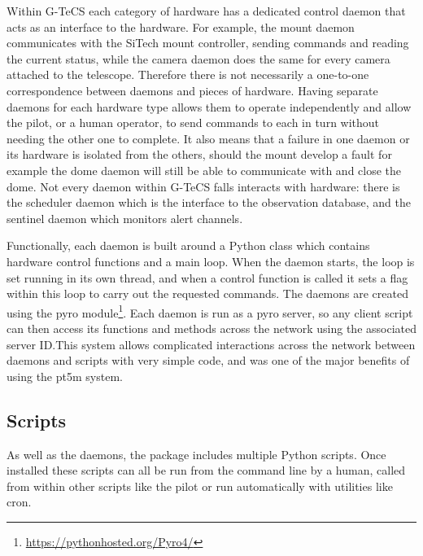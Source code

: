 \begin{colsection}
\begin{colsection}
Within G-TeCS each category of hardware has a dedicated control daemon that acts as an interface to the hardware. For example, the mount daemon communicates with the SiTech mount controller, sending commands and reading the current status, while the camera daemon does the same for every camera attached to the telescope. Therefore there is not necessarily a one-to-one correspondence between daemons and pieces of hardware. Having separate daemons for each hardware type allows them to operate independently and allow the pilot, or a human operator, to send commands to each in turn without needing the other one to complete. It also means that a failure in one daemon or its hardware is isolated from the others, should the mount develop a fault for example the dome daemon will still be able to communicate with and close the dome. Not every daemon within G-TeCS falls interacts with hardware: there is the scheduler daemon which is the interface to the observation database, and the sentinel daemon which monitors alert channels.

Functionally, each daemon is built around a Python class which contains hardware control functions and a main loop. When the daemon starts, the loop is set running in its own thread, and when a control function is called it sets a flag within this loop to carry out the requested commands. The daemons are created using the \gls{pyro} module\footnote{\url{https://pythonhosted.org/Pyro4/}}. Each daemon is run as a \gls{pyro} server, so any client script can then access its functions and methods across the network using the associated server ID.\@ This system allows complicated interactions across the network between daemons and scripts with very simple code, and was one of the major benefits of using the pt5m system.

\end{colsection}


\subsection{Scripts}
\label{sec:scripts}
\begin{colsection}

As well as the daemons, the  package includes multiple Python scripts. Once installed these scripts can all be run from the command line by a human, called from within other scripts like the pilot or run automatically with utilities like cron.


\end{colsection}
\end{colsection}
